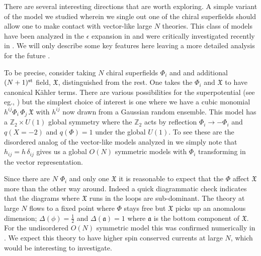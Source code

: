 \documentclass[11pt]{article}
\newcommand{\AS}{\mathfrak{X}}
\newcommand{\Ax}{\mathfrak{a}}
\begin{document}
There are several interesting directions that are worth exploring.  A simple variant of the model we studied wherein we single out one of the chiral superfields  should allow one to make contact with  vector-like large $N$ theories. This class of  models have been analyzed in the $\epsilon$ expansion in \cite{Ferreira:1996az,Ferreira:1997hx} and were critically investigated recently in \cite{Chester:2015qca,Chester:2015lej}. We will only describe some key features here leaving a more detailed analysis for the future  \cite{Chang:2021vm}.

To be precise, consider taking $N$ chiral superfields $\Phi_i$ and and additional $(N+1)^{\rm st}$ field, $\AS$, distinguished from the rest.  One takes the $\Phi_i$ and $\AS$ to have canonical K\"ahler terms. There are various possibilities for the superpotential (see eg., \cite{Chester:2015qca}) but the simplest choice of interest is one where we have a cubic monomial $h^{ij} \Phi_i \,\Phi_j \, \AS$ with $h^{ij}$ now drawn from a Gaussian random ensemble. This model has a $\mathbb{Z}_2 \times U(1)$ global symmetry where the  $\mathbb{Z}_2$ acts by reflection $\Phi_i \to -\Phi_i$ and $q(X = -2)$ and $q(\Phi) =1$ under the global $U(1)$. To see these are the disordered analog of the vector-like models analyzed in \cite{Chester:2015qca} we simply note that $h_{ij} = h\, \delta_{ij}$ gives us a global $O(N)$ symmetric models with $\Phi_i$ transforming in the vector representation.

Since there are $N$ $\Phi_i$ and only one $\AS$ it is reasonable to expect that the $\Phi$ affect $\AS$ more than the other way around. Indeed a quick diagrammatic check indicates that the diagrams where $\AS$ runs in the loops are sub-dominant. The theory at large $N$ flows to a fixed point where $\Phi$ stays free but $\AS$ picks up an anomalous dimension; $\Delta(\phi) = \frac{1}{2}$ and $\Delta(\Ax) = 1$ where $\Ax$ is the bottom component of $\AS$.  For the undisordered $O(N) $ symmetric model this was confirmed numerically in  \cite{Chester:2015lej}. We expect this theory to have higher spin conserved currents at large $N$, which would be interesting to investigate.
 
\end{document}
